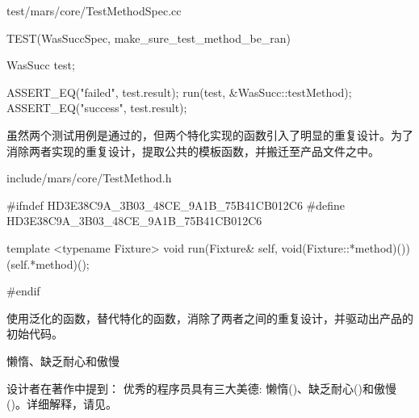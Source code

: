 \begin{content}
\begin{nodiff}{test/mars/core/TestMethodSpec.cc}
\begin{c++}
TEST(WasSuccSpec, make_sure_test_method_be_ran) {
  WasSucc test;

  ASSERT_EQ("failed", test.result);
  run(test, &WasSucc::testMethod);
  ASSERT_EQ("success", test.result);
}
\end{c++}
\end{nodiff}

虽然两个测试用例是通过的，但两个特化实现的函数引入了明显的重复设计。为了消除两者实现的重复设计，提取公共的模板函数，并搬迁至产品文件之中。

\begin{nodiff}{include/mars/core/TestMethod.h}
\begin{c++}
#ifndef HD3E38C9A_3B03_48CE_9A1B_75B41CB012C6
#define HD3E38C9A_3B03_48CE_9A1B_75B41CB012C6

template <typename Fixture>
void run(Fixture& self, void(Fixture::*method)()) {
  (self.*method)();
}

#endif
\end{c++}
\end{nodiff}

使用泛化的函数，替代特化的函数，消除了两者之间的重复设计，并驱动出产品的初始代码。

\begin{episode}{懒惰、缺乏耐心和傲慢}
\begin{content}

设计者在著作中提到：
优秀的程序员具有三大美德: 懒惰()、缺乏耐心()和傲慢()。详细解释，请见。


\end{content}
\end{episode}
\end{content}
